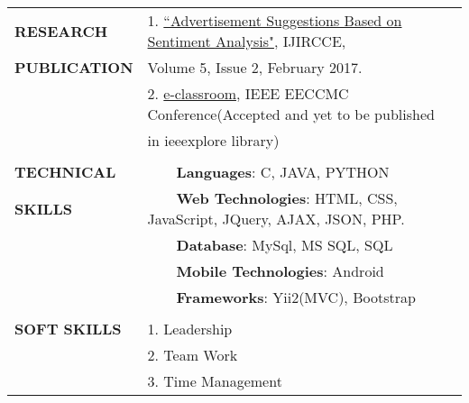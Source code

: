 \documentclass[letterpaper,11pt,oneside]{article}
\newcommand{\tabitem}{~~\llap{\textbullet}~~}
\begin{document}
	\newpage
	
	
	\noindent \begin{tabular}{@{} l l}
		\textbf{RESEARCH}    &1. \href{http://www.ijircce.com/upload/2017/february/44_6_Advertisement.pdf}{``Advertisement Suggestions Based on Sentiment Analysis"}, IJIRCCE,\\ 	
		\textbf{PUBLICATION}    & \hspace{0.3cm} Volume 5, Issue 2, February 2017. \\ 
		&2. \href{http://eeccmc.org/acceptance.php}{e-classroom},  IEEE EECCMC Conference(Accepted and yet to be published \\ & \hspace{0.3cm} in ieeexplore library)
		\\
		& \\
		\textbf{TECHNICAL}    & \tabitem \textbf{Languages}: C, JAVA, PYTHON\\
		\textbf{SKILLS}    & \tabitem \textbf{Web Technologies}: HTML, CSS, JavaScript, JQuery, AJAX, JSON, PHP. \\
		&\tabitem \textbf{Database}: MySql, MS SQL, SQL\\
		&\tabitem \textbf{Mobile Technologies}: Android\\
		&\tabitem \textbf{Frameworks}: Yii2(MVC), Bootstrap\\
		& \\
		\textbf{SOFT SKILLS}    &1. Leadership\\ 	 &2. Team Work \\ 
		&3. Time Management
		\\
		
	\end{tabular}
	
\end{document}
